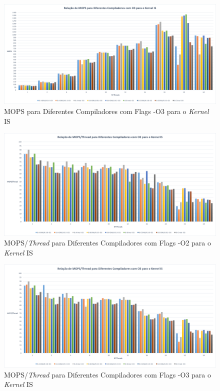 \documentclass[conference,compsoc]{IEEEtran}
\begin{document}
\begin{figure}[h!]
\centering
\includegraphics[scale=0.225]{OMP/mops_dif_comp-O3_IS_nodo-641.png}
\caption{MOPS para Diferentes Compiladores com Flags -O3 para o \textit{Kernel} IS}
\end{figure}

\begin{figure}[h!]
\centering
\includegraphics[scale=0.225]{OMP/mops-thread_dif_comp-O2_IS_nodo-641.png}
\caption{MOPS/\textit{Thread} para Diferentes Compiladores com Flags -O2 para o \textit{Kernel} IS}
\end{figure}

\begin{figure}[h!]
\centering
\includegraphics[scale=0.225]{OMP/mops-thread_dif_comp-O3_IS_nodo-641.png}
\caption{MOPS/\textit{Thread} para Diferentes Compiladores com Flags -O3 para o \textit{Kernel} IS}
\end{figure}

\end{document}
